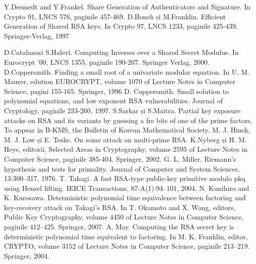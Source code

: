 \documentclass[12]{report}
\begin{document}
\begin{thebibliography}{9}
Y.Desmedt and Y.Frankel. Share Generation of Authenticators and Signature. In Crypto 91, LNCS 576, paginile 457-469.
D.Boneh și M.Franklin. Efficient Generation of Shared RSA keys. In Crypto 97, LNCS 1233, paginile 425-439. Springer-Verlag, 1997

D.Catalanoși S.Halevi. Computing Inverses over a Shared Secret Modulus. In Eurocrypt '00, LNCS 1355, paginile 190-207. Springer Verlag, 2000.
D.Coppersmith. Finding a small root of a univariate modular equation. In U. M. Maurer, edution EUROCRYPT, volume 1070 of Lecture Notes in Computer Science, pagini 155-165. Springer, 1996
D. Coppersmith. Small solution to polynomial equations, and low exponent RSA vulnerabilities. Journal of Cryptology, paginile 233-260, 1997.
S.Sarkar și S.Maitra. Partial key exposure attacks on RSA and its variants by guessing a fre bits of one of the prime factors. To appear in B-KMS, the Bulletin of Korean Mathematical Society.
M. J. Hinek, M. J. Low și E. Teske. On some attack on multi-prime RSA. K.Nyberg și H. M. Heys, editorii, Selected Areas in Cryptography, volume 2595 of Lecture Notes in Computer Science, paginile 385-404. Springer, 2002.
G. L. Miller. Riemann’s hypothesis and tests for primality. Journal of Computer and System Sciences, 13:300–317, 1976. 
 T. Takagi. A fast RSA-type public-key primitive modulo pkq using Hensel lifting. IEICE Transactions, 87-A(1):94–101, 2004. 
 N. Kunihiro and K. Kurosawa. Deterministic polynomial time equivalence between factoring and key-recovery attack on Takagi’s RSA. In T. Okamoto and X. Wang, editors, Public Key Cryptography, volume 4450 of Lecture Notes in Computer Science, paginile 412–425. Springer, 2007.
 A. May. Computing the RSA secret key is deterministic polynomial time equivalent to factoring. In M. K. Franklin, editor, CRYPTO, volume 3152 of Lecture Notes in Computer Science, paginile 213–219. Springer, 2004. 
\end{thebibliography}
\end{document}
